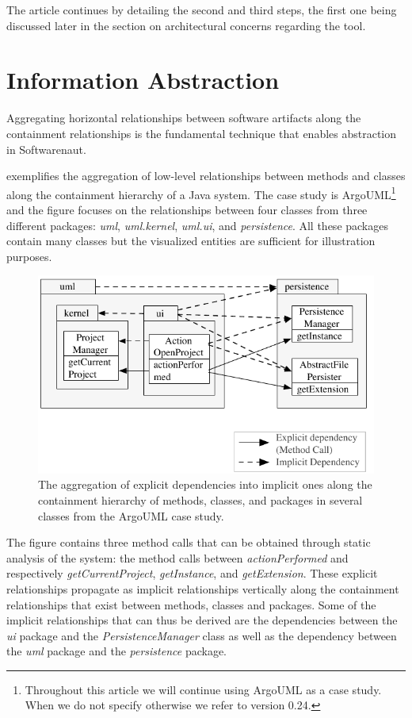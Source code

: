 \documentclass[preprint,12pt]{elsarticle}
\newcommand{\cd}[1]{{\em{#1}}}
\newcommand\on[1]{\nbc{ON}{#1}{red}} %
\begin{document}
The article continues by detailing the second and third steps, the first one being discussed later in the section on architectural concerns regarding the tool.

\section {Information Abstraction} \label{sec:org}

Aggregating horizontal relationships between software artifacts along the containment relationships is the fundamental technique that enables abstraction in Softwarenaut. 
\on{! (I wish I knew what that meant)}

 exemplifies the aggregation of low-level relationships between methods and classes along the containment hierarchy of a Java system. The case study is ArgoUML\footnote{Throughout this article we will continue using ArgoUML as a case study. When we do not specify otherwise we refer to version 0.24.} and the figure focuses on the relationships between four classes from three different packages: \cd{uml}, \cd{uml.kernel}, \cd{uml.ui}, and \cd{persistence}. All these packages contain many classes but the visualized entities are sufficient for illustration purposes. 

\begin{figure}[ht]
\begin{center}
\includegraphics[width=0.75\linewidth]{DependencyAggregation}
\caption{The aggregation of explicit dependencies into implicit ones along the containment hierarchy of methods, classes, and packages in several classes from the ArgoUML case study.}
\end{center}
\end{figure}
 
The figure contains three method calls that can be obtained through static analysis of the system: the method calls between \cd{actionPerformed} and respectively \cd{getCurrentProject}, \cd{getInstance}, and \cd{getExtension}. These explicit relationships propagate as implicit relationships vertically along the containment relationships that exist between methods, classes and packages. Some of the implicit relationships that can thus be derived are the dependencies between the \cd{ui} package and the \cd{PersistenceManager} class as well as the dependency between the \cd{uml} package and the \cd{persistence} package. 
\end{document}
